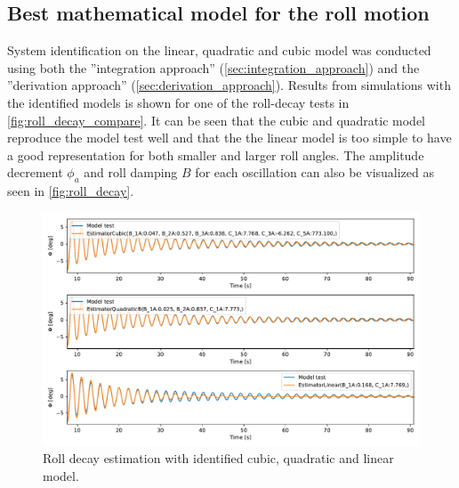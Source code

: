 \subsection{Best mathematical model for the roll motion}
System identification on the linear, quadratic and cubic model was conducted using both the ''integration approach'' (\autoref{sec:integration_approach}) and the ''derivation approach'' (\autoref{sec:derivation_approach}).
Results from simulations with the identified models is shown for one of the roll-decay tests in \autoref{fig:roll_decay_compare}. It can be seen that the cubic and quadratic model reproduce the model test well and that the the linear model is too simple to have a good representation for both smaller and larger roll angles. The amplitude decrement $\phi_a$ and roll damping $B$ for each oscillation can also be visualized as seen in \autoref{fig:roll_decay}.

\begin{figure}[!htb]
    \centering
    \includegraphics[width=\linewidth]{kappa/images/roll_decay_model_compare.pdf}
    \caption{Roll decay estimation with identified cubic, quadratic and linear model.}
    \label{fig:roll_decay_compare}
\end{figure}

